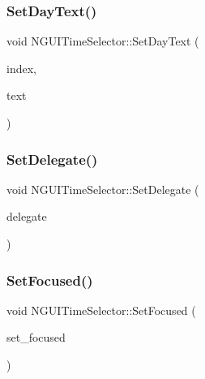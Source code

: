 \hypertarget{class_n_g_u_i_time_selector_ace5542ae59832e3a9173eeed0d53641c}{}\label{class_n_g_u_i_time_selector_ace5542ae59832e3a9173eeed0d53641c} 
\subsubsection{\texorpdfstring{Set\+Day\+Text()}{SetDayText()}}
{\footnotesize\ttfamily void N\+G\+U\+I\+Time\+Selector\+::\+Set\+Day\+Text (\begin{DoxyParamCaption}\item[{int}]{index,  }\item[{string \&in}]{text }\end{DoxyParamCaption})}

\hypertarget{class_n_g_u_i_time_selector_a3efe55286a0b84083fda40c2a1faa042}{}\label{class_n_g_u_i_time_selector_a3efe55286a0b84083fda40c2a1faa042} 
\subsubsection{\texorpdfstring{Set\+Delegate()}{SetDelegate()}}
{\footnotesize\ttfamily void N\+G\+U\+I\+Time\+Selector\+::\+Set\+Delegate (\begin{DoxyParamCaption}\item[{N\+G\+U\+I\+Time\+Selector\+Delegate@}]{delegate }\end{DoxyParamCaption})}

\hypertarget{class_n_g_u_i_time_selector_af6fb515ae0b40347032362d1958e3707}{}\label{class_n_g_u_i_time_selector_af6fb515ae0b40347032362d1958e3707} 
\subsubsection{\texorpdfstring{Set\+Focused()}{SetFocused()}}
{\footnotesize\ttfamily void N\+G\+U\+I\+Time\+Selector\+::\+Set\+Focused (\begin{DoxyParamCaption}\item[{bool}]{set\+\_\+focused }\end{DoxyParamCaption})}

